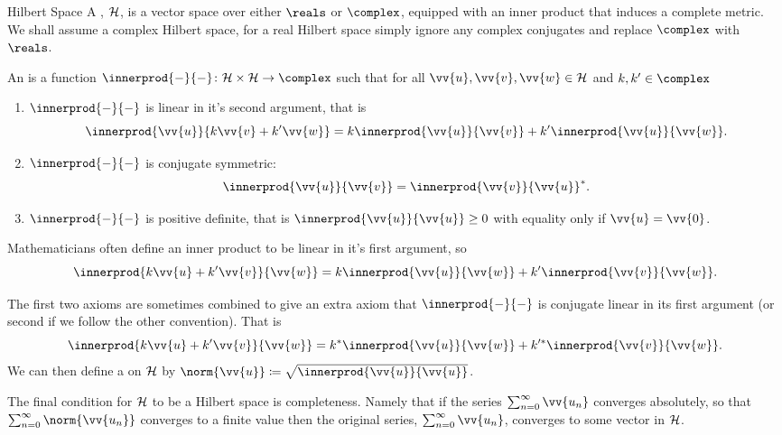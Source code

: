 \begin{dfn}{Hilbert Space}{}
    A , \(\mathcal{H}\), is a vector space over either \(\reals\) or \(\complex\), equipped with an inner product that induces a complete metric.
    We shall assume a complex Hilbert space, for a real Hilbert space simply ignore any complex conjugates and replace \(\complex\) with \(\reals\).
    
    An  is a function \(\innerprod{-}{-} \colon \hilbert \times \hilbert \to \complex\) such that for all \(\vv{u}, \vv{v}, \vv{w} \in \hilbert\) and \(k, k' \in \complex\)
    \begin{enumerate}
        \item \(\innerprod{-}{-}\) is linear in it's second argument, that is
        \begin{equation}
            \innerprod{\vv{u}}{k\vv{v} + k'\vv{w}} = k\innerprod{\vv{u}}{\vv{v}} + k'\innerprod{\vv{u}}{\vv{w}}.
        \end{equation}
        \item \(\innerprod{-}{-}\) is conjugate symmetric:
        \begin{equation}
            \innerprod{\vv{u}}{\vv{v}} = \innerprod{\vv{v}}{\vv{u}}^*.
        \end{equation}
        \item \(\innerprod{-}{-}\) is positive definite, that is \(\innerprod{\vv{u}}{\vv{u}} \ge 0\) with equality only if \(\vv{u} = \vv{0}\).
    \end{enumerate}
    \begin{wrn}
        Mathematicians often define an inner product to be linear in it's first argument, so
        \begin{equation}
            \innerprod{k\vv{u} + k'\vv{v}}{\vv{w}} = k\innerprod{\vv{u}}{\vv{w}} + k'\innerprod{\vv{v}}{\vv{w}}.
        \end{equation}
    \end{wrn}
    The first two axioms are sometimes combined to give an extra axiom that \(\innerprod{-}{-}\) is conjugate linear in its first argument (or second if we follow the other convention).
    That is
    \begin{equation}
        \innerprod{k\vv{u} + k'\vv{v}}{\vv{w}} = k^*\innerprod{\vv{u}}{\vv{w}} + k'^*\innerprod{\vv{v}}{\vv{w}}.
    \end{equation}
    We can then define a  on \(\mathcal{H}\) by \(\norm{\vv{u}} \coloneqq \sqrt{\innerprod{\vv{u}}{\vv{u}}}\).
    
    The final condition for \(\mathcal{H}\) to be a Hilbert space is completeness.
    Namely that if the series \(\sum_{n=0}^{\infty} \vv{u_n}\) converges absolutely, so that \(\sum_{n=0}^{\infty} \norm{\vv{u_n}}\) converges to a finite value then the original series, \(\sum_{n=0}^{\infty} \vv{u_n}\), converges to some vector in \(\mathcal{H}\).
\end{dfn}

